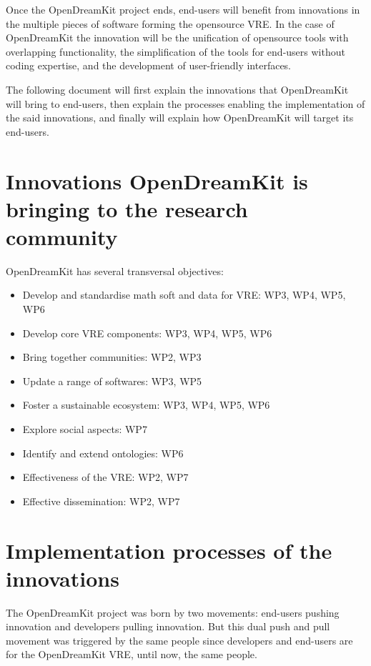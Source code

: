 \documentclass{deliverablereport}
\begin{document}
Once the OpenDreamKit project ends, end-users will benefit from innovations in the multiple pieces of software forming the opensource VRE. In the case of OpenDreamKit the innovation will be the unification of opensource tools with overlapping functionality, the simplification of the tools for end-users without coding expertise, and the development of user-friendly interfaces.

The following document will first explain the innovations that OpenDreamKit will bring to end-users, then explain the processes enabling the implementation of the said innovations, and finally will explain how OpenDreamKit will target its end-users.


\section{Innovations OpenDreamKit is bringing to the research community}

OpenDreamKit has several transversal objectives:

\begin{itemize}
\item{Develop and standardise math soft and data for VRE: WP3, WP4, WP5, WP6}
\item{Develop core VRE components: WP3, WP4, WP5, WP6}
\item{Bring together communities: WP2, WP3}
\item{Update a range of softwares: WP3, WP5}
\item{Foster a sustainable ecosystem: WP3, WP4, WP5, WP6}
\item{Explore social aspects: WP7}
\item{Identify and extend ontologies: WP6}
\item{Effectiveness of the VRE: WP2, WP7}
\item{Effective dissemination: WP2, WP7}


\end{itemize}


\section{Implementation processes of the innovations}

The OpenDreamKit project was born by two movements: end-users pushing innovation and developers pulling innovation. But this dual push and pull movement was triggered by the same people since developers and end-users are for the OpenDreamKit VRE, until now, the same people.
\end{document}
